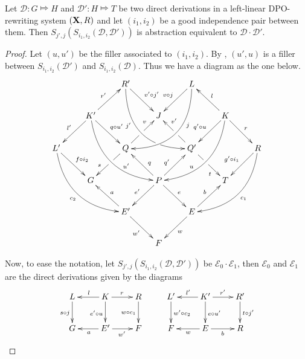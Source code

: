 \documentclass[a4paper,UKenglish,cleveref,pdftex, thm-restate,numberwithinsect]{lipics}
\def\R{\mathsf{R}}
\def\X{\textbf {\textup{X}}}
\newcommand{\dder}[1]{\mathscr{#1}}
\begin{document}

\begin{lemma}\label{lem:rev}
	Let $\dder{D}\colon G\Mapsto H$ and $\dder{D}'\colon H\Mapsto T$ be two direct derivations in a left-linear DPO-rewriting system $(\X, \R)$ and let $(i_1,i_2)$ be a good independence pair between them. Then $S_{j',j}(S_{i_1,i_2}(\dder{D}, \dder{D'}))$ is abstraction equivalent to $\dder{D}\cdot \dder{D}'$. 
\end{lemma}
\begin{proof}Let $(u,u')$ be the filler associated to $(i_1, i_2)$. By , $(u', u)$ is a filler between $S_{i_1,i_2}(\dder{D}')$ and $S_{i_1,i_2}(\dder{D})$. Thus we have a diagram as the one below.
		\[\xymatrix{&&R' \ar@/_1cm/[ddrr]_(.35){j'}|(.7)\hole \ar[dr]^{v'\circ j'}&& L \ar@/^1cm/[ddll]^(.35){j}  \ar[dl]_{v\circ j}\\&K'\ar[dr]^{q\circ u'}\ar[dl]_{l'} \ar@/_.8cm/[ddrr]^(.65){u'}\ar[ur]^{r'}&& J && K \ar@/^.8cm/[ddll]_(.65){u}\ar[dl]_{q'\circ u}\ar[lu]_{l} \ar[dr]^{r}\\L' \ar[dr]^{f\circ i_2} \ar@/_.8cm/[ddrr]_{c_2}&& Q \ar[dl]|(.42)\hole_(.64){s}\ar[ur]|(.48)\hole^(.7){v}&&Q' \ar[dr]|(.42)\hole_(.65){t} \ar[ul]|(.48)\hole_(.7){v'}&&R\ar@/^.8cm/[ddll]^{c_1}\ar[dl]_{g'\circ i_1}\\&G &&P\ar[dr]^{e} \ar[dl]_{e'}\ar[ur]^(.4){q'}\ar[ul]_(.4){q}&&T\\&&E' \ar[ul]_{a}\ar[dr]_{w'} &&E\ar[ur]^{b} \ar[dl]^{w}\\&&&F}\]
	
	Now, to ease the notation, let $S_{j',j}(S_{i_1,i_2}(\dder{D}, \dder{D'}))$ be $\dder{E}_0\cdot \dder{E}_1$, then $\dder{E}_0$ and $\dder{E}_1$ are the direct derivations given by the diagrams
	\[\xymatrix{L \ar[d]_{s\circ j}& K\ar[l]_{l} \ar[r]^{r} \ar[d]_{e'\circ u} & R \ar[d]_{w\circ c_1} & L' \ar[d]^{w'\circ c_2}& K' \ar[d]^{e\circ u'} \ar[r]^{r'} \ar[l]_{l'}& R' \ar[d]^{t\circ j'}\\G & E' \ar[l]^{a}  \ar[r]_{w'}& F & F & E \ar[l]^{w} \ar[r]_{b} & R}\]
	

\end{proof}
\end{document}
